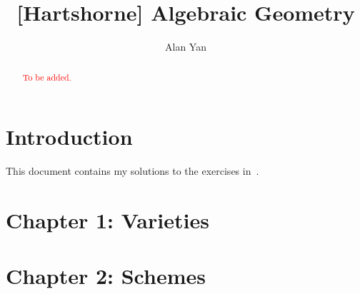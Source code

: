 \documentclass[]{pcmi}
\theoremstyle{plain}
\theoremstyle{definition}
\theoremstyle{remark}
\begin{document}
%
%

\title[Algebraic Geometry]{[Hartshorne] Algebraic Geometry} 

%    
%    
\author{Alan Yan}
\date{} 
\address{
\newline Department of Mathematics,
Harvard University,
Cambridge, MA 02138 
}

%    
%    
\keywords{}
\begin{abstract}
    \textcolor{red}{To be added.}
\end{abstract}

%    
%    
\maketitle

\tableofcontents

%    
%    



\section{Introduction} 

This document contains my solutions to the exercises in~\cite{Harts77}. 
\section{Chapter 1: Varieties}

\section{Chapter 2: Schemes}
\end{document}
